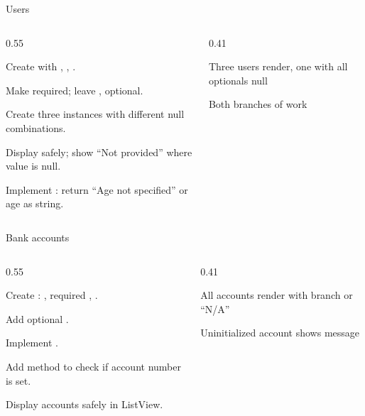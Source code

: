 \documentclass[10pt,aspectratio=169,t]{beamer}
\begin{document}
\begin{frame}[eyebrow=Task I]{Users}
  {\small
  \begin{columns}[T]
    \begin{column}{0.55\textwidth}
      \begin{steps}
        \item Create  with , , .
        \item Make  required; leave ,  optional.
        \item Create three  instances with different null combinations.
        \item Display safely; show ``Not provided'' where value is null.
        \item Implement : return ``Age not specified'' or age as string.
      \end{steps}
    \end{column}
    \begin{column}{0.41\textwidth}
      \begin{checklist}
        \item Three users render, one with all optionals null
        \item Both branches of  work
      \end{checklist}
    \end{column}
  \end{columns}
  }
\end{frame}

\begin{frame}[eyebrow=Task II]{Bank accounts}
  {\small
  \begin{columns}[T]
    \begin{column}{0.55\textwidth}
      \begin{steps}
        \item Create : , required , .
        \item Add optional .
        \item Implement .
        \item Add method to check if account number is set.
        \item Display accounts safely in ListView.
      \end{steps}
    \end{column}
    \begin{column}{0.41\textwidth}
      \begin{checklist}
        \item All accounts render with branch or ``N/A''
        \item Uninitialized account shows message
      \end{checklist}
    \end{column}
  \end{columns}
  }
\end{frame}
\end{document}
